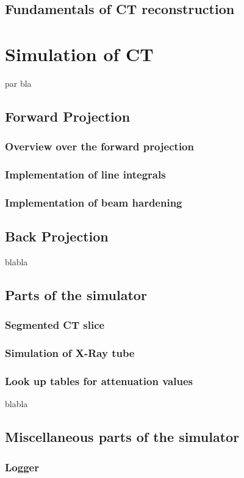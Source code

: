 \section{Fundamentals of CT reconstruction}

\chapter{Simulation of CT}
par bla\cite{deMan}
\section{Forward Projection}
\subsection{Overview over the forward projection}
\subsection{Implementation of line integrals}
\subsection{Implementation of beam hardening}
\section{Back Projection}
blabla\cite{CUDABackprojection}
\section{Parts of the simulator}
\subsection{Segmented CT slice}
\subsection{Simulation of X-Ray tube}
\subsection{Look up tables for attenuation values}
blabla\cite{AttenuationTable}
\section{Miscellaneous parts of the simulator}
\subsection{Logger}
